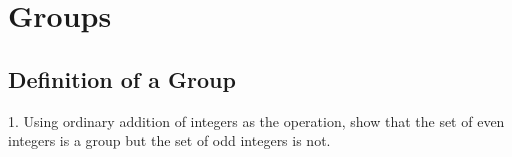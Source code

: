 \section{Groups}
\subsection{Definition of a Group}
\begin{mdframed}[style=darkQuesion]
  1. Using ordinary addition of integers as the operation, show that the set of
  even integers is a group but the set of odd integers is not.
\end{mdframed}

